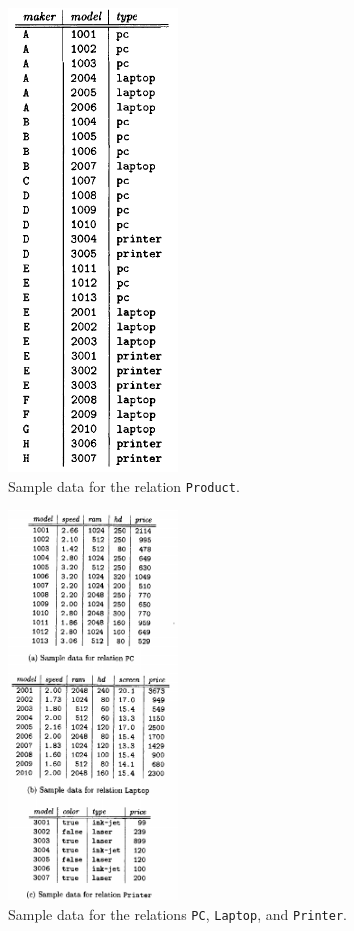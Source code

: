 \documentclass{cshwk}
\begin{document}
\begin{figure}[htbp]
    \centering
    \includegraphics[width=0.4\textwidth]{hw3-1.png}
    \caption{Sample data for the relation \texttt{Product}.}
    \label{fig:sample-data-product}
\end{figure}

\begin{figure}[htbp]
    \centering
    \includegraphics[width=0.4\textwidth]{hw3-2.png}
    \caption{Sample data for the relations \texttt{PC}, \texttt{Laptop}, and \texttt{Printer}.}
    \label{fig:sample-data-other}
\end{figure}
\end{document}
